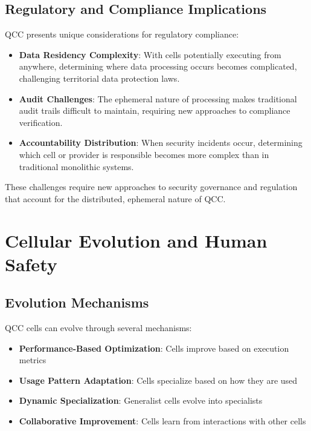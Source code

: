 \documentclass[11pt,a4paper]{article}
\begin{document}
\subsection{Regulatory and Compliance Implications}

QCC presents unique considerations for regulatory compliance:

\begin{itemize}
    \item \textbf{Data Residency Complexity}: With cells potentially executing from anywhere, determining where data processing occurs becomes complicated, challenging territorial data protection laws.
    
    \item \textbf{Audit Challenges}: The ephemeral nature of processing makes traditional audit trails difficult to maintain, requiring new approaches to compliance verification.
    
    \item \textbf{Accountability Distribution}: When security incidents occur, determining which cell or provider is responsible becomes more complex than in traditional monolithic systems.
\end{itemize}

These challenges require new approaches to security governance and regulation that account for the distributed, ephemeral nature of QCC.

\section{Cellular Evolution and Human Safety}

\subsection{Evolution Mechanisms}

QCC cells can evolve through several mechanisms:

\begin{itemize}
    \item \textbf{Performance-Based Optimization}: Cells improve based on execution metrics
    \item \textbf{Usage Pattern Adaptation}: Cells specialize based on how they are used
    \item \textbf{Dynamic Specialization}: Generalist cells evolve into specialists
    \item \textbf{Collaborative Improvement}: Cells learn from interactions with other cells
\end{itemize}
\end{document}

